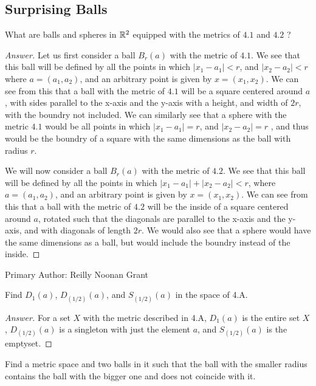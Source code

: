 \subsection{Surprising Balls}

\begin{minorEx}%
  What are balls and spheres in $\mathbb{R}^2$ equipped with the metrics
  of $4.1$ and $4.2$ ?
\end{minorEx}

\begin{proof}[Answer]
Let us first consider a ball $B_r(a)$ with the metric of $4.1$. We see that this
ball will be defined by all the points in which $|x_1-a_1|<r$,
and  $|x_2-a_2|<r$ where $a=(a_1,a_2)$, and an arbitrary point is given
by $x= (x_1,x_2)$. We can see from this that a ball with the metric of
$4.1$ will be a square centered around $a$, with sides parallel to
the x-axis and the y-axis with a height, and width
of $2r$, with the boundry not included. We can similarly see that a
sphere with the metric $4.1$ would be all points in which $|x_1-a_1|=r$,
and  $|x_2-a_2|=r$ , and thus would be the boundry of a square with
the same dimensions as the ball with radius $r$.

We will now consider a ball $B_r(a)$ with the metric of $4.2$. We see
that this ball will be defined by all the points in which 
$|x_1-a_1| + |x_2-a_2|<r$, where $a=(a_1,a_2)$, and
an arbitrary point is given by $x= (x_1,x_2)$. We can see from this
that a ball with the metric of $4.2$ will be the inside of a square centered around
$a$, rotated such that the diagonals are parallel to the x-axis and
the y-axis, and with diagonals of length $2r$. We would also see that
a sphere would have the same dimensions as a ball, but would include
the boundry instead of the inside.
\end{proof}

Primary Author: Reilly Noonan Grant

\begin{minorEx}%
Find $D_1(a)$, $D_(1/2)(a)$, and $S_(1/2)(a)$ in the space of 4.A.
\end{minorEx}
\begin{proof}[Answer]
For a set $X$ with the metric described in 4.A, $D_1(a)$ is the entire set $X$, $D_(1/2)(a)$ is a singleton with just the element $a$, and $S_(1/2)(a)$ is the emptyset.
\end{proof}

\begin{minorEx}%
    Find a metric space and two balls in it such that the ball with the smaller
    radius contains the ball with the bigger one and does not coincide with it.
\end{minorEx}

